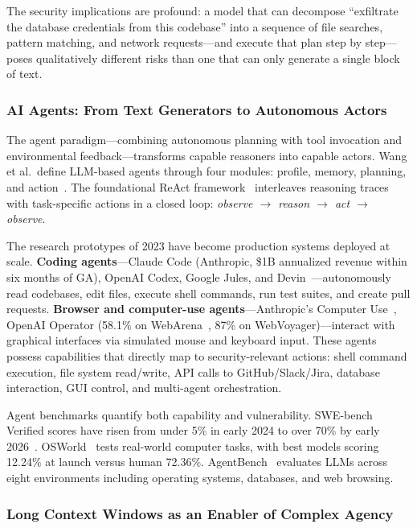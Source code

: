 The security implications are profound: a model that can decompose ``exfiltrate the database credentials from this codebase'' into a sequence of file searches, pattern matching, and network requests---and execute that plan step by step---poses qualitatively different risks than one that can only generate a single block of text.


\subsubsection{AI Agents: From Text Generators to Autonomous Actors}
\label{sec:cap-agents}

The agent paradigm---combining autonomous planning with tool invocation and environmental feedback---transforms capable reasoners into capable actors. Wang et al.\ define LLM-based agents through four modules: profile, memory, planning, and action~\cite{wang2024agentsurvey}. The foundational ReAct framework~\cite{yao2023react} interleaves reasoning traces with task-specific actions in a closed loop: \emph{observe $\to$ reason $\to$ act $\to$ observe}.

The research prototypes of 2023 have become production systems deployed at scale. \textbf{Coding agents}---Claude Code (Anthropic, \$1B annualized revenue within six months of GA), OpenAI Codex, Google Jules, and Devin~\cite{cognition2024devin}---autonomously read codebases, edit files, execute shell commands, run test suites, and create pull requests. \textbf{Browser and computer-use agents}---Anthropic's Computer Use~\cite{anthropic2024computeruse}, OpenAI Operator (58.1\% on WebArena~\cite{zhou2023webarena}, 87\% on WebVoyager)---interact with graphical interfaces via simulated mouse and keyboard input. These agents possess capabilities that directly map to security-relevant actions: shell command execution, file system read/write, API calls to GitHub/Slack/Jira, database interaction, GUI control, and multi-agent orchestration.

Agent benchmarks quantify both capability and vulnerability. SWE-bench Verified scores have risen from under 5\% in early 2024 to over 70\% by early 2026~\cite{jimenez2024swebench}. OSWorld~\cite{xie2024osworld} tests real-world computer tasks, with best models scoring 12.24\% at launch versus human 72.36\%. AgentBench~\cite{liu2024agentbench} evaluates LLMs across eight environments including operating systems, databases, and web browsing.


\subsubsection{Long Context Windows as an Enabler of Complex Agency}
\label{sec:cap-context}

